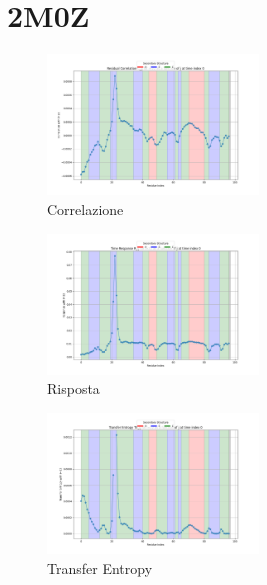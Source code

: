 \documentclass{article}
\begin{document}
\section{2M0Z}
\begin{figure}[h]
    \centering
    \includegraphics[width=0.5\textwidth]{images/2m0zResidual Correlation C_ij for i=22 as a function of j at time index 0.png}
    \caption{Correlazione}
\end{figure}
\begin{figure}[h]
    \centering
    \includegraphics[width=0.5\textwidth]{images/2m0zTime Response R_ij for i=22 as a function of j at time index 0.png}
    \caption{Risposta}
\end{figure}

\begin{figure}[h]
    \centering
    \includegraphics[width=0.5\textwidth]{images/2m0zTransfer Entropy TE_ij for i=22 as a function of j at time index 0.png}
    \caption{Transfer Entropy}
\end{figure}
\end{document}
